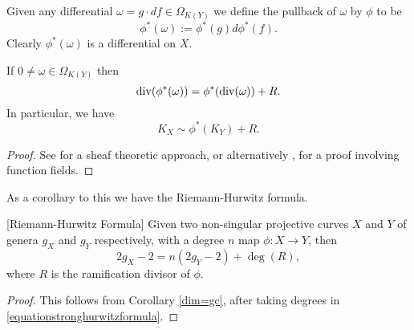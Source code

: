  
Given any differential $ \omega = g\cdot df \in \Omega_{K(Y)}$ we define the pullback of $\omega$ by $\phi$ to be
    \[
    \phi^*(\omega) := \phi^*(g)d\phi^*(f).
    \]
Clearly $\phi^*(\omega)$ is a differential on $X$.

    \begin{thm}
    If $0 \neq \omega \in \Omega_{K(Y)}$ then
        \begin{equation}\label{equationstronghurwitzformula}
        \operatorname{div}(\phi^*(\omega)) = \phi^*(\operatorname{div}(\omega)) + R.
        \end{equation}
    In particular, we have
        \[
        K_X \sim \phi^*(K_Y) + R.
        \]
    \end{thm}
    \begin{proof}
    See \cite[Chap.\ IV, \S 2, Prop.\ 2.3]{hart} for a sheaf theoretic approach, or alternatively \cite[Thm. 3.4.6]{stichtenoth}, for a proof involving function fields.
    \end{proof}


As a corollary to this we have the Riemann-Hurwitz formula.

    \begin{cor}\label{hur}[Riemann-Hurwitz Formula]
    Given two non-singular projective curves $X$ and $Y$ of genera $g_X$ and $g_Y$ respectively, with a degree $n$ map $\phi\colon X \rightarrow Y$, then
        \[
        2g_X - 2 = n(2g_Y -2) + \deg(R),
        \]
    where $R$ is the ramification divisor of $\phi$.
    \end{cor}
    \begin{proof}
    This follows from Corollary \ref{dim=gc}, after taking degrees in \eqref{equationstronghurwitzformula}.
    \end{proof}





















